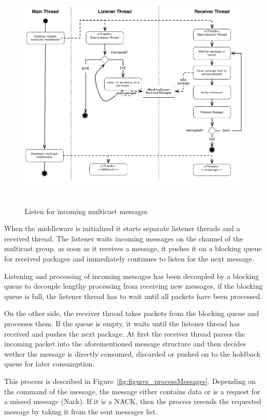 \begin{figure}[H]
    \centering
        \includegraphics[height=4.5in]{figures/receivePackets.pdf}
    \caption{Listen for incoming multicast messages}
    \label{fig:figures_processReceivePackage}
\end{figure}
When the middleware is initialized it starts separate listener threads and a received thread. The listener waits incoming messages on the channel of the multicast group. as soon as it receives a message, it pushes it on a blocking queue for received packages and immediately continues to listen for the next message. 

Listening and processing of incoming messages has been decoupled by a blocking queue to decouple lengthy processing from receiving new messages, if the blocking queue is full, the listener thread has to wait until all packets have been processed. 

On the other side, the receiver thread takes packets from the blocking queue and processes them. If the queue is empty,  it waits until the listener thread has received and pushes the next package. 
At first the receiver thread parses the incoming packet into the aforementioned message structure and then decides wether the message is directly consumed, discarded or pushed on to the holdback queue for later consumption.

This process is described in Figure~\ref{fig:figures_processMessages}.
Depending on the command of the message, the message either contains data or is a request for a missed message (Nack). If it is a NACK,  then the process resends the requested message by taking it from the sent messages list.



